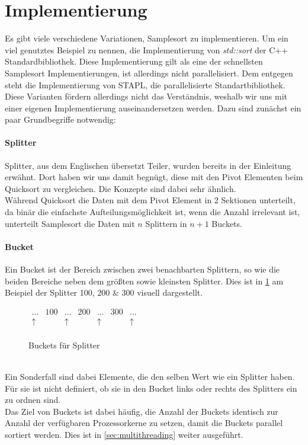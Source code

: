 \section{Implementierung}
	\label{sec:implementation}
	Es gibt viele verschiedene Variationen, Samplesort zu implementieren.
	Um ein viel genutztes Beispiel zu nennen, die Implementierung von \textit{std::sort} der C++ Standardbibliothek. \autocite{unknown-author-2019}
	Diese Implementierung gilt als eine der schnellsten Samplesort Implementierungen, ist allerdings nicht parallelisiert.
	Dem entgegen steht die Implementierung von STAPL, die parallelisierte Standartbibliothek. \autocite{berlin-2007}\\
	Diese Varianten fördern allerdings nicht das Verständnis, weshalb wir uns mit einer eigenen Implementierung auseinandersetzen werden.
	Dazu sind zunächst ein paar Grundbegriffe notwendig:
	\paragraph{Splitter}
		Splitter, aus dem Englischen übersetzt Teiler, wurden bereits in der Einleitung erwähnt.
		Dort haben wir uns damit begnügt, diese mit den Pivot Elementen beim Quicksort zu vergleichen.
		Die Konzepte sind dabei sehr ähnlich.\\
		Während Quicksort die Daten mit dem Pivot Element in 2 Sektionen unterteilt, da binär die einfachste Aufteilungsmöglichkeit ist, wenn die Anzahl irrelevant ist, unterteilt Samplesort die Daten mit $n$ Splittern in $n+1$ Buckets.
	\paragraph{Bucket}
		Ein Bucket ist der Bereich zwischen zwei benachbarten Splittern, so wie die beiden Bereiche neben dem größten sowie kleinsten Splitter.
		Dies ist in \ref{fig:buckets-from-splitters} am Beispiel der Splitter 100, 200 \& 300 visuell dargestellt.
		\begin{figure}[h]
			\caption{Buckets für Splitter \autocite{benson-2022}}
			\label{fig:buckets-from-splitters}
			\begin{center}
				\begin{math}
					\begin{matrix}
						 \ldots  & 100 &  \ldots  & 200 &  \ldots  & 300 &  \ldots  \\
						\uparrow &     & \uparrow &     & \uparrow &     & \uparrow \\
					\end{matrix}
				\end{math}
			\end{center}
		\end{figure}\\
		Ein Sonderfall sind dabei Elemente, die den selben Wert wie ein Splitter haben.
		Für sie ist nicht definiert, ob sie in den Bucket links oder rechts des Splitters ein zu ordnen sind.\\
		Das Ziel von Buckets ist dabei häufig, die Anzahl der Buckets identisch zur Anzahl der verfügbaren Prozessorkerne zu setzen, damit die Buckets parallel sortiert werden.
		Dies ist in \ref{sec:multithreading} weiter ausgeführt.

